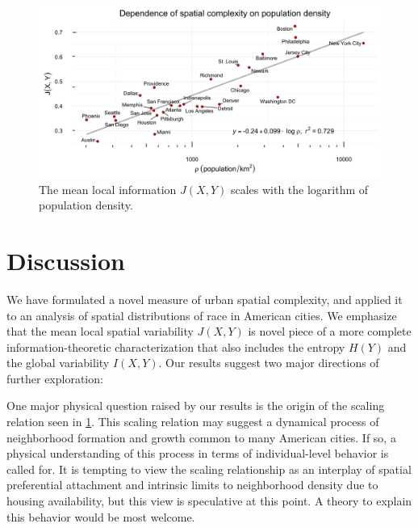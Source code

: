 \documentclass[english]{scrartcl}
\begin{document}
	\begin{figure}
		\includegraphics[width=1\textwidth]{figs/density_fisher.png}
		\caption{The mean local information $J(X,Y)$ scales with the logarithm of population density.}
		\label{fig:density}
	\end{figure}	

\section{Discussion}

	We have formulated a novel measure of urban spatial complexity, and applied it to an analysis of spatial distributions of race in American cities. We emphasize that the mean local spatial variability $J(X,Y)$ is novel piece of a more complete information-theoretic characterization that also includes the entropy $H(Y)$ and the global variability $I(X,Y)$. Our results suggest two major directions of further exploration: 

	One major physical question raised by our results is the origin of the scaling relation seen in \ref{fig:density}. This scaling relation may suggest a dynamical process of neighborhood formation and growth common to many American cities. If so, a physical understanding of this process in terms of individual-level behavior is called for. It is tempting to view the scaling relationship as an interplay of spatial preferential attachment and intrinsic limits to neighborhood density due to housing availability, but this view is speculative at this point. A theory to explain this behavior would be most welcome. 
\end{document}
